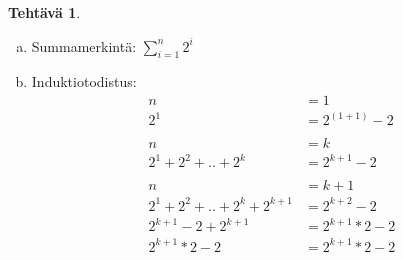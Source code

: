 \documentclass[12pt,a4paper,final]{article}
\theoremstyle{definition}
\newtheorem{ex}{Tehtävä}
\begin{document}
\begin{ex}
  \begin{enumerate}[(a)]
    \item Summamerkintä: $ \sum_{i=1}^n 2^i$
    \item Induktiotodistus:
      \begin{align*}
        n &= 1\\
        2^1 &= 2^(1+1) - 2\\
        \\
        n &= k \\
        2^1 + 2^2 + .. + 2^k &= 2^{k+1} - 2\\
        \\
        n &= k+1\\
        2^1 + 2^2 + .. + 2^k + 2^{k+1} &= 2^{k+2} - 2\\
        2^{k+1} - 2 + 2^{k+1} &= 2^{k+1} * 2 - 2\\
        2^{k+1} * 2 - 2  &= 2^{k+1} * 2 - 2\\
      \end{align*}
  \end{enumerate}
\end{ex}
\end{document}
